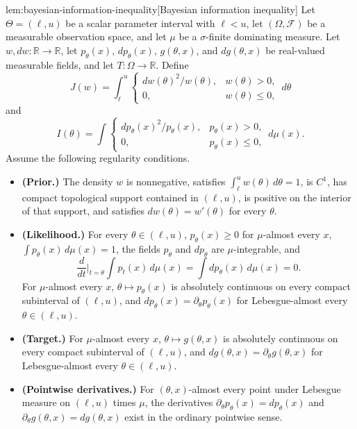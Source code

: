 \begin{lemmav}{lem:bayesian-information-inequality}[Bayesian information inequality]
Let \(\Theta=(\ell,u)\) be a scalar parameter interval with \(\ell<u\), let \((\Omega,\mathcal F)\) be a measurable observation space, and let \(\mu\) be a \(\sigma\)-finite dominating measure.  Let \(w,dw:\mathbb R\to\mathbb R\), let \(p_\theta(x)\), \(dp_\theta(x)\), \(g(\theta,x)\), and \(dg(\theta,x)\) be real-valued measurable fields, and let \(T:\Omega\to\mathbb R\).  Define
\[
J(w)=\int_\ell^u
\begin{cases}
dw(\theta)^2/w(\theta),& w(\theta)>0,\\
0,& w(\theta)\le 0,
\end{cases}
\,d\theta
\]
and
\[
I(\theta)=\int
\begin{cases}
dp_\theta(x)^2/p_\theta(x),& p_\theta(x)>0,\\
0,& p_\theta(x)\le 0,
\end{cases}
\,d\mu(x).
\]
Assume the following regularity conditions.
\begin{itemize}
\item \textbf{(Prior.)}  The density \(w\) is nonnegative, satisfies \(\int_\ell^u w(\theta)\,d\theta=1\), is \(C^1\), has compact topological support contained in \((\ell,u)\), is positive on the interior of that support, and satisfies \(dw(\theta)=w'(\theta)\) for every \(\theta\).
\item \textbf{(Likelihood.)}  For every \(\theta\in(\ell,u)\), \(p_\theta(x)\ge 0\) for \(\mu\)-almost every \(x\), \(\int p_\theta(x)\,d\mu(x)=1\), the fields \(p_\theta\) and \(dp_\theta\) are \(\mu\)-integrable, and
\[
\frac{d}{dt}\bigg|_{t=\theta}\int p_t(x)\,d\mu(x)
=
\int dp_\theta(x)\,d\mu(x)
=
0.
\]
For \(\mu\)-almost every \(x\), \(\theta\mapsto p_\theta(x)\) is absolutely continuous on every compact subinterval of \((\ell,u)\), and \(dp_\theta(x)=\partial_\theta p_\theta(x)\) for Lebesgue-almost every \(\theta\in(\ell,u)\).
\item \textbf{(Target.)}  For \(\mu\)-almost every \(x\), \(\theta\mapsto g(\theta,x)\) is absolutely continuous on every compact subinterval of \((\ell,u)\), and \(dg(\theta,x)=\partial_\theta g(\theta,x)\) for Lebesgue-almost every \(\theta\in(\ell,u)\).
\item \textbf{(Pointwise derivatives.)}  For \((\theta,x)\)-almost every point under Lebesgue measure on \((\ell,u)\) times \(\mu\), the derivatives \(\partial_\theta p_\theta(x)=dp_\theta(x)\) and \(\partial_\theta g(\theta,x)=dg(\theta,x)\) exist in the ordinary pointwise sense.

\end{itemize}
\end{lemmav}
